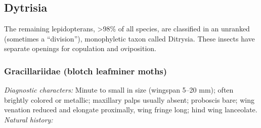 \documentclass[letterpaper, 11pt]{article}
\begin{document}
\subsection{Dytrisia}
The remaining lepidopterans, \textgreater98\% of all species, are classified in an unranked (sometimes a ``division''), monophyletic taxon called Ditrysia. These insects have separate openings for copulation and oviposition.

\subsubsection{Gracillariidae (blotch leafminer moths)}
\noindent{}\textit{Diagnostic characters:} Minute to small in size (wingspan 5--20 mm); often brightly colored or metallic; maxillary palps usually absent;  proboscis bare; wing venation reduced and elongate proximally, wing fringe long; hind wing lanceolate.\\

\noindent{}\textit{Natural history:} 
\end{document}
